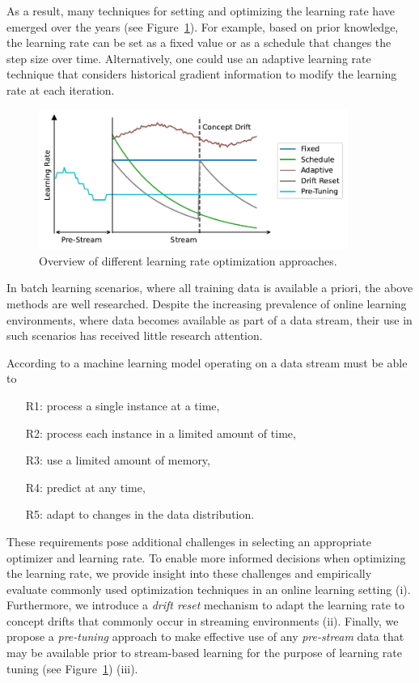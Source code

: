\documentclass{article} %
\begin{document}
As a result, many techniques for setting and optimizing the learning rate have emerged over the years (see Figure~\ref{fig:lr_overview}).
For example, based on prior knowledge, the learning rate can be set as a fixed value or as a schedule that changes the step size over time.
Alternatively, one could use an adaptive learning rate technique that considers historical gradient information to modify the learning rate at each iteration.
\begin{figure}[ht]
   \centering
   \includegraphics[width=0.9\textwidth]{figures/lr_overview.pdf}
   \caption{Overview of different learning rate optimization approaches.}
   \label{fig:lr_overview}
\end{figure}
In batch learning scenarios, where all training data is available a priori, the above methods are well researched.
Despite the increasing prevalence of online learning environments, where data becomes available as part of a data stream, their use in such scenarios has received little research attention.

According to \citet{bifetMOAMassiveOnline2010} a machine learning model operating on a data stream must be able to
\begin{enumerate}
   \item[R1:] process a single instance at a time,\label{rq:single_instance}
   \item[R2:] process each instance in a limited amount of time,\label{rq:limited_time}
   \item[R3:] use a limited amount of memory,\label{rq:limited_memory}
   \item[R4:] predict at any time,\label{rq:predict_any_time}
   \item[R5:] adapt to changes in the data distribution.\label{rq:adapt_to_drift}
\end{enumerate}

These requirements pose additional challenges in selecting an appropriate optimizer and learning rate.
To enable more informed decisions when optimizing the learning rate, we provide insight into these challenges and empirically evaluate commonly used optimization techniques in an online learning setting (i).
Furthermore, we introduce a \textit{drift reset} mechanism to adapt the learning rate to concept drifts that commonly occur in streaming environments (ii).
Finally, we propose a \textit{pre-tuning} approach to make effective use of any \textit{pre-stream} data that may be available prior to stream-based learning for the purpose of learning rate tuning (see Figure~\ref{fig:lr_overview}) (iii).
\end{document}
